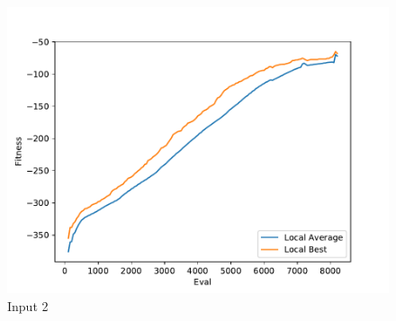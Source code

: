 \documentclass{standalone}
\begin{document}
\begin{figure}[!htb]
	\caption{Input 2}
	\label{fig:graph_2056}
	\includegraphics[width=\textwidth]{../graphs/graphs/2056.pdf}
\end{figure}
\end{document}
